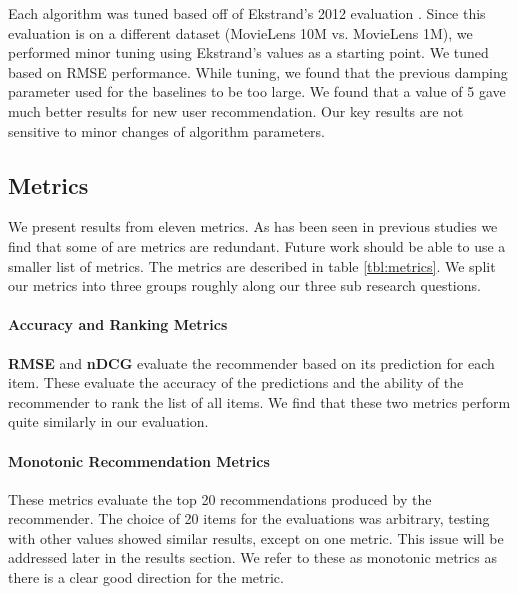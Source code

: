 \documentclass[letterpaper]{sig-alternate}
\begin{document}
  
  Each algorithm was tuned based off of Ekstrand's 2012 evaluation \cite{ekstrand2012recommenders}.
  Since this evaluation is on a different dataset (MovieLens 10M vs. MovieLens 1M), we performed minor tuning using Ekstrand's values as a starting point.
  We tuned based on RMSE performance.
  While tuning, we found that the previous damping parameter used for the baselines to be too large.
  We found that a value of 5 gave much better results for new user recommendation.
  Our key results are not sensitive to minor changes of algorithm parameters.  

  \subsection*{Metrics}


  We present results from eleven metrics.
  As has been seen in previous studies \cite{herlockerEvaluating} we find that some of are metrics are redundant.
  Future work should be able to use a smaller list of metrics.
  The metrics are described in table \ref{tbl:metrics}.
  We split our metrics into three groups roughly along our three sub research questions.
  
  \vspace{-0.5em}
  \paragraph{Accuracy and Ranking Metrics}
  {\bf RMSE} and {\bf nDCG} evaluate the recommender based on its prediction for each item.
  These evaluate the accuracy of the predictions and the ability of the recommender to rank the list of all items.
  We find that these two metrics perform quite similarly in our evaluation.

  \addtocounter{footnote}{1}

  \vspace{-0.5em}
  \paragraph{Monotonic Recommendation Metrics}
  These metrics evaluate the top 20 recommendations produced by the recommender.
  The choice of 20 items for the evaluations was arbitrary, testing with other values showed similar results, except on one metric.
  This issue will be addressed later in the results section.
  We refer to these as monotonic metrics as there is a clear good direction for the metric.
\end{document}

